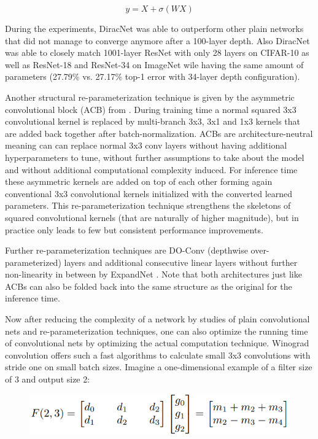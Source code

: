 \begin{equation}
	y = X + \sigma(WX)
\end{equation}

During the experiments, DiracNet was able to outperform other plain networks that did not manage to converge anymore after a 100-layer depth. Also DiracNet was able to closely match 1001-layer ResNet with only 28 layers on CIFAR-10 as well as ResNet-18 and ResNet-34 on ImageNet wile having the same amount of parameters (27.79\% vs. 27.17\% top-1 error with 34-layer depth configuration). 

Another structural re-parameterization technique is given by the asymmetric convolutional block (ACB) from \cite{XiaohanDing.2019}. During training time a normal squared 3x3 convolutional kernel is replaced by multi-branch 3x3, 3x1 and 1x3 kernels that are added back together after batch-normalization. ACBs are architecture-neutral meaning can can replace normal 3x3 conv layers without having additional hyperparameters to tune, without further assumptions to take about the model and without additional computational complexity induced. For inference time these asymmetric kernels are added on top of each other forming again conventional 3x3 convolutional kernels initialized with the converted learned parameters. This re-parameterization technique strengthens the skeletons of squared convolutional kernels (that are naturally of higher magnitude), but in practice only leads to few but consistent performance improvements.  

Further re-parameterization techniques are DO-Conv (depthwise over-parameterized) layers \cite{JinmingCao.2020} and additional consecutive linear layers without further non-linearity in between by ExpandNet \cite{ShuxuanGuo.2021}. Note that both architectures just like ACBs can also be folded back into the same structure as the original for the inference time. 

Now after reducing the complexity of a network by studies of plain convolutional nets and re-parameterization techniques, one can also optimize the running time of convolutional nets by optimizing the actual computation technique. Winograd convolution offers such a fast algorithms to calculate small 3x3 convolutions with stride one on small batch sizes. Imagine a one-dimensional example of a filter size of 3 and output size 2:

\begin{figure}[ht]
	\begin{center}
		\includegraphics[width=0.8\linewidth]{images/winograd1.PNG}
	\end{center}
	\label{fig:winograd1}
\end{figure}


